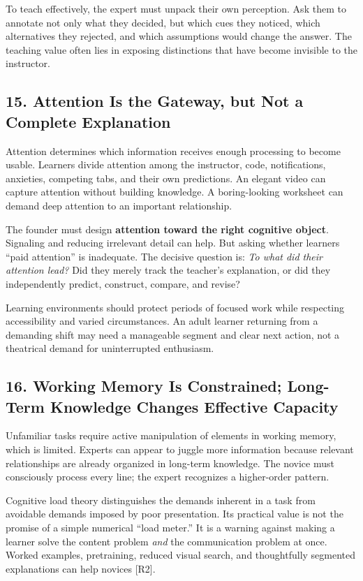 To teach effectively, the expert must unpack their own perception. Ask them to annotate not only what they decided, but which cues they noticed, which alternatives they rejected, and which assumptions would change the answer. The teaching value often lies in exposing distinctions that have become invisible to the instructor.

\subsection*{15. Attention Is the Gateway, but Not a Complete Explanation}

Attention determines which information receives enough processing to become usable. Learners divide attention among the instructor, code, notifications, anxieties, competing tabs, and their own predictions. An elegant video can capture attention without building knowledge. A boring-looking worksheet can demand deep attention to an important relationship.

The founder must design \textbf{attention toward the right cognitive object}. Signaling and reducing irrelevant detail can help. But asking whether learners ``paid attention'' is inadequate. The decisive question is: \emph{To what did their attention lead?} Did they merely track the teacher's explanation, or did they independently predict, construct, compare, and revise?

Learning environments should protect periods of focused work while respecting accessibility and varied circumstances. An adult learner returning from a demanding shift may need a manageable segment and clear next action, not a theatrical demand for uninterrupted enthusiasm.

\subsection*{16. Working Memory Is Constrained; Long-Term Knowledge Changes Effective Capacity}

Unfamiliar tasks require active manipulation of elements in working memory, which is limited. Experts can appear to juggle more information because relevant relationships are already organized in long-term knowledge. The novice must consciously process every line; the expert recognizes a higher-order pattern.

Cognitive load theory distinguishes the demands inherent in a task from avoidable demands imposed by poor presentation. Its practical value is not the promise of a simple numerical ``load meter.'' It is a warning against making a learner solve the content problem \emph{and} the communication problem at once. Worked examples, pretraining, reduced visual search, and thoughtfully segmented explanations can help novices [R2].

